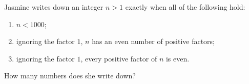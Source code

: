 Jasmine writes down an integer $n>1$ exactly when all of the following hold:
\begin{enumerate}
\item[(a)] $n<1000$;
\item[(b)] ignoring the factor $1$, $n$ has an even number of positive factors;
\item[(c)] ignoring the factor $1$, every positive factor of $n$ is even.
\end{enumerate}
How many numbers does she write down?
